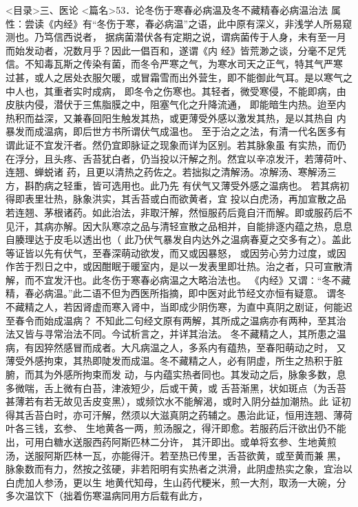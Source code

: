 \documentclass[a4paper,12pt,UTF8,twoside]{ctexbook}
\begin{document}
<目录>三、医论
<篇名>53．论冬伤于寒春必病温及冬不藏精春必病温治法
属性：尝读《内经》有“冬伤于寒，春必病温”之语，此中原有深义，非浅学人所易窥测也。乃笃信西说者， 
据病菌潜伏各有定期之说，谓病菌传于人身，未有至一月而始发动者，况数月乎？因此一倡百和，遂谓《内 
经》皆荒渺之谈，分毫不足凭信。不知毒瓦斯之传染有菌，而冬令严寒之气，为寒水司天之正气，特其气严寒 
过甚，或人之居处衣服欠暖，或冒霜雪而出外营生，即不能御此气耳。是以寒气之中人也，其重者实时成病， 
即冬令之伤寒也。其轻者，微受寒侵，不能即病，由皮肤内侵，潜伏于三焦脂膜之中，阻塞气化之升降流通， 
即能暗生内热。迨至内热积而益深，又兼春回阳生触发其热，或更薄受外感以激发其热，是以其热自 
内暴发而成温病，即后世方书所谓伏气成温也。 
至于治之之法，有清一代名医多有谓此证不宜发汗者。然仍宜即脉证之现象而详为区别。若其脉象虽 
有实热，而仍在浮分，且头疼、舌苔犹白者，仍当投以汗解之剂。然宜以辛凉发汗，若薄荷叶、连翘、蝉蜕诸 
药，且更以清热之药佐之。若拙拟之清解汤。凉解汤、寒解汤三方，斟酌病之轻重，皆可选用也。此乃先 
有伏气又薄受外感之温病也。 
若其病初得即表里壮热，脉象洪实，其舌苔或白而欲黄者，宜 
投以白虎汤，再加宣散之品若连翘、茅根诸药。如此治法，非取汗解，然恒服药后竟自汗而解。即或服药后不 
见汗，其病亦解。因大队寒凉之品与清轻宣散之品相并，自能排逐内蕴之热，息息自腠理达于皮毛以透出也（ 
此乃伏气暴发自内达外之温病春夏之交多有之）。盖此等证皆以先有伏气，至春深萌动欲发，而又或因暴怒， 
或因劳心劳力过度，或因作苦于烈日之中，或因酣眠于暖室内，是以一发表里即壮热。治之者，只可宣散清 
解，而不宜发汗也。此冬伤于寒春必病温之大略治法也。 
《内经》又谓∶“冬不藏精，春必病温。”此二语不但为西医所指摘，即中医对此节经文亦恒有疑意。 
谓冬不藏精之人，若因肾虚而寒入肾中，当即成少阴伤寒，为直中真阴之剧证，何能迟至春令而始成温病？ 
不知此二句经文原有两解，其所成之温病亦有两种，至其治法又皆与寻常治法不同。今试析言之，并详其治法。 
冬不藏精之人，其所患之温病，有因猝然感冒而成者。大凡病温之人，多系内有蕴热，至春阳萌动之时， 
又薄受外感拘束，其热即陡发而成温。冬不藏精之人，必有阴虚，所生之热积于脏腑，而其为外感所拘束而发 
动，与内蕴实热者同也。其发动之后，脉象多数，息多微喘，舌上微有白苔，津液短少，后或干黄，或 
舌苔渐黑，状如斑点（为舌苔甚薄若有若无故见舌皮变黑），或频饮水不能解渴，或时入阴分益加潮热。此 
证初得其舌苔白时，亦可汗解，然须以大滋真阴之药辅之。愚治此证，恒用连翘、薄荷叶各三钱，玄参、 
生地黄各一两，煎汤服之，得汗即愈。若服药后汗欲出仍不能出，可用白糖水送服西药阿斯匹林二分许， 
其汗即出。或单将玄参、生地黄煎汤，送服阿斯匹林一瓦，亦能得汗。若至热已传里，舌苔欲黄，或至黄而兼 
黑，脉象数而有力，然按之弦硬，非若阳明有实热者之洪滑，此阴虚热实之象，宜治以白虎加人参汤，更以生 
地黄代知母，生山药代粳米，煎一大剂，取汤一大碗，分多次温饮下（拙着伤寒温病同用方后载有此方， 
\end{document}
